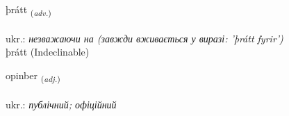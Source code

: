 \documentclass[frontgrid, backgrid]{flacards}\usepackage[]{graphicx}\usepackage[]{xcolor}
\begin{document}
\renewcommand{\flhead}{\vskip5pt \fboxsep=0pt {\small\bfseries\footnotesize Atviksorð | прислівник}}
\renewcommand{\fcfoot}{\vskip5pt \fboxsep=0pt \hspace{2pt}{\small\bfseries\footnotesize 1K}}

\renewcommand{\blhead}{\vskip5pt {\small\bfseries\footnotesize Atviksorð | прислівник }}
\renewcommand{\bcfoot}{\vskip5pt \hspace{2pt}{\small\bfseries\footnotesize 1K}}


{þrátt \small{\textsubscript{(\textit{adv.})}} \\[1ex]
\textphonetic{[θrauht]} \\
ukr.: \emph{незважаючи на (завжди вживається у виразі: 'þrátt fyrir')} \\  [2ex]
þrátt (Indeclinable)}

\renewcommand{\flhead}{\vskip5pt \fboxsep=0pt {\small\bfseries\footnotesize Lýsingarorð | прикметник}}
\renewcommand{\fcfoot}{\vskip5pt \fboxsep=0pt \hspace{2pt}{\small\bfseries\footnotesize 1K}}

\renewcommand{\blhead}{\vskip5pt {\small\bfseries\footnotesize Lýsingarorð | прикметник }}
\renewcommand{\bcfoot}{\vskip5pt \hspace{2pt}{\small\bfseries\footnotesize 1K}}


{opinber \small{\textsubscript{(\textit{adj.})}} \\[1ex] %
\textphonetic{[ɔːpɪnpɛr]} \\
ukr.: \emph{публічний; офіційний} \\  [2ex]
\renewcommand*{\arraystretch}{0.8}
}
\end{document}
